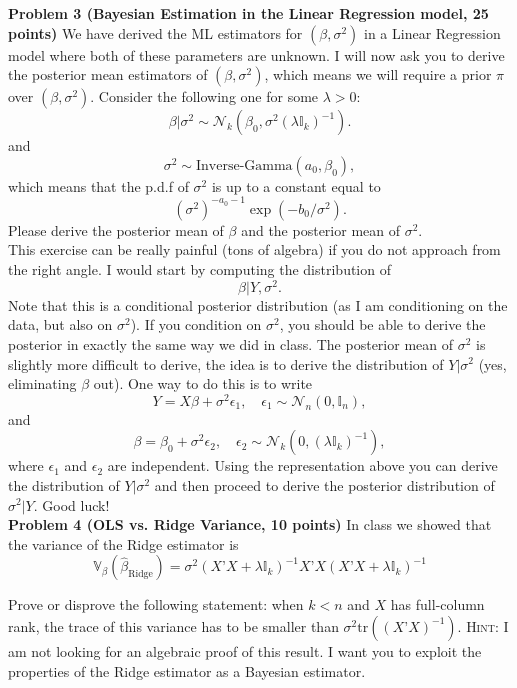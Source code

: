 \documentclass[11pt]{article} %
\begin{document}
\noindent \textbf{Problem 3 (Bayesian Estimation in the Linear Regression model, 25 points)} We have derived the ML estimators for $(\beta, \sigma^2)$ in a Linear Regression model where both of these parameters are unknown. I will now ask you to derive the posterior mean estimators of $(\beta, \sigma^2)$, which means we will require a prior $\pi$ over $(\beta, \sigma^2)$. Consider the following one for some $\lambda > 0$: 
\[ \beta | \sigma^2 \sim \mathcal{N}_k( \beta_0 , \sigma^2 (\lambda \mathbb{I}_k)^{-1} ).     \]
and
\[ \sigma^2 \sim \textrm{Inverse-Gamma} (a_0, \beta_0), \]
which means that the p.d.f of $\sigma^2$ is up to a constant equal to
\[ (\sigma^2)^{-a_0-1}  \exp \left ( -b_0 / \sigma^2  \right).\]
\noindent Please derive the posterior mean of $\beta$ and the posterior mean of $\sigma^2$. \\

 This exercise can be really painful (tons of algebra) if you do not approach from the right angle. I would start by computing the distribution of
\[ \beta | Y, \sigma^2.\]
Note that this is a conditional posterior distribution (as I am conditioning on the data, but also on $\sigma^2$). If you condition on $\sigma^2$, you should be able to derive the posterior in exactly the same way we did in class. The posterior mean of $\sigma^2$ is slightly more difficult to derive, the idea is to derive the distribution of $Y | \sigma^2$ (yes, eliminating $\beta$ out). One way to do this is to write
\[ Y = X\beta + \sigma^2 \epsilon_1, \quad \epsilon_1 \sim \mathcal{N}_n(0, \mathbb{I}_n), \]
and
\[ \beta = \beta_0 + \sigma^2 \epsilon_2, \quad \epsilon_2 \sim \mathcal{N}_k(0, (\lambda \mathbb{I}_k)^{-1}), \]
where $\epsilon_1$ and $\epsilon_2$ are independent. Using the representation above you can derive the distribution of $Y | \sigma^2$ and then proceed to derive the posterior distribution of $\sigma^2 | Y$.  Good luck!\\

\noindent \textbf{Problem 4 (OLS vs. Ridge Variance, 10 points)} In class we showed that the variance of the Ridge estimator is
\[ \mathbb{V}_{\beta} (\widehat{\beta}_{\textrm{Ridge}}) = \sigma^2( X’X + \lambda \mathbb{I}_k)^{-1} X’X ( X’X + \lambda \mathbb{I}_k)^{-1}  \]

\noindent Prove or disprove the following statement: when $k<n$ and $X$ has full-column rank, the trace of this variance has to be smaller than $\sigma^2 \textrm{tr}((X’X)^{-1})$. {\scshape Hint:} I am not looking for an algebraic proof of this result. I want you to exploit the properties of the Ridge estimator as a Bayesian estimator.   \\
\end{document}
